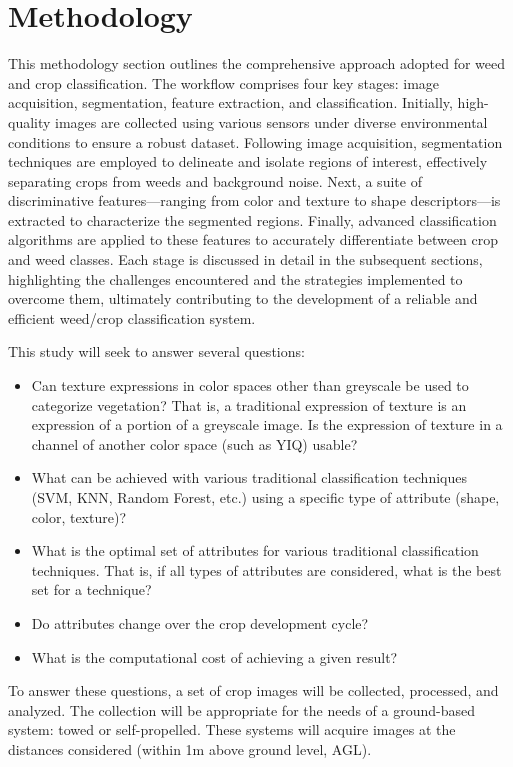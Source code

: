 \documentclass[letterpaper]{report}
\begin{document}
\chapter{Methodology}
\label{section:methodology}
This methodology section outlines the comprehensive approach adopted for weed and crop classification. The workflow comprises four key stages: image acquisition, segmentation, feature extraction, and classification. Initially, high-quality images are collected using various sensors under diverse environmental conditions to ensure a robust dataset. Following image acquisition, segmentation techniques are employed to delineate and isolate regions of interest, effectively separating crops from weeds and background noise. Next, a suite of discriminative features—ranging from color and texture to shape descriptors—is extracted to characterize the segmented regions. Finally, advanced classification algorithms are applied to these features to accurately differentiate between crop and weed classes. Each stage is discussed in detail in the subsequent sections, highlighting the challenges encountered and the strategies implemented to overcome them, ultimately contributing to the development of a reliable and efficient weed/crop classification system.

This study will seek to answer several questions:
\begin{itemize}
	\item{Can texture expressions in color spaces other than greyscale be used to categorize vegetation? That is, a traditional expression of texture is an expression of a portion of a greyscale image. Is the expression of texture in a channel of another color space (such as YIQ) usable?}
	\item{What can be achieved with various traditional classification techniques (SVM, KNN, Random Forest, etc.) using a specific type of attribute (shape, color, texture)?}
	\item{What is the optimal set of attributes for various traditional classification techniques. That is, if all types of attributes are considered, what is the best set for a technique?}
	\item{Do attributes change over the crop development cycle?}
	\item{What is the computational cost of achieving a given result?}
\end{itemize}

To answer these questions, a set of crop images will be collected, processed, and analyzed. The collection will be appropriate for the needs of a ground-based system: towed or self-propelled. These systems will acquire images at the distances considered (within 1m above ground level, AGL).
\end{document}
